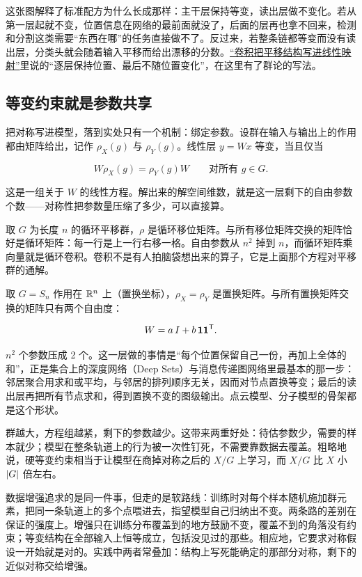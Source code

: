 这张图解释了标准配方为什么长成那样：主干层保持等变，读出层做不变化。若从第一层起就不变，位置信息在网络的最前面就没了，后面的层再也拿不回来，检测和分割这类需要``东西在哪''的任务直接做不了。反过来，若整条链都等变而没有读出层，分类头就会随着输入平移而给出漂移的分数。\hyperref[sec:14-Deep-Learning/04-Convolutional-Networks/01]{``卷积把平移结构写进线性映射''}里说的``逐层保持位置、最后不随位置变化''，在这里有了群论的写法。

\subsection{等变约束就是参数共享}

把对称写进模型，落到实处只有一个机制：绑定参数。设群在输入与输出上的作用都由矩阵给出，记作 \(\rho_X(g)\) 与 \(\rho_Y(g)\)。线性层 \(y=Wx\) 等变，当且仅当

\[
W\rho_X(g)=\rho_Y(g)W\qquad\text{对所有 }g\in G.
\]

这是一组关于 \(W\) 的线性方程。解出来的解空间维数，就是这一层剩下的自由参数个数——对称性把参数量压缩了多少，可以直接算。

取 \(G\) 为长度 \(n\) 的循环平移群，\(\rho\) 是循环移位矩阵。与所有移位矩阵交换的矩阵恰好是循环矩阵：每一行是上一行右移一格。自由参数从 \(n^2\) 掉到 \(n\)，而循环矩阵乘向量就是循环卷积。卷积不是有人拍脑袋想出来的算子，它是上面那个方程对平移群的通解。

取 \(G=S_n\) 作用在 \(\mathbb{R}^n\) 上（置换坐标），\(\rho_X=\rho_Y\) 是置换矩阵。与所有置换矩阵交换的矩阵只有两个自由度：

\[
W=a\,I+b\,\mathbf{1}\mathbf{1}^{\mathsf{T}}.
\]

\(n^2\) 个参数压成 2 个。这一层做的事情是``每个位置保留自己一份，再加上全体的和''，正是集合上的深度网络（Deep Sets）与消息传递图网络里最基本的那一步：邻居聚合用求和或平均，与邻居的排列顺序无关，因而对节点置换等变；最后的读出层再把所有节点求和，得到置换不变的图级输出。点云模型、分子模型的骨架都是这个形状。

群越大，方程组越紧，剩下的参数越少。这带来两重好处：待估参数少，需要的样本就少；模型在整条轨道上的行为被一次性钉死，不需要靠数据去覆盖。粗略地说，硬等变约束相当于让模型在商掉对称之后的 \(X/G\) 上学习，而 \(X/G\) 比 \(X\) 小 \(\left|G\right|\) 倍左右。

数据增强追求的是同一件事，但走的是软路线：训练时对每个样本随机施加群元素，把同一条轨道上的多个点喂进去，指望模型自己归纳出不变。两条路的差别在保证的强度上。增强只在训练分布覆盖到的地方鼓励不变，覆盖不到的角落没有约束；等变结构在全部输入上恒等成立，包括没见过的那些。相应地，它要求对称假设一开始就是对的。实践中两者常叠加：结构上写死能确定的那部分对称，剩下的近似对称交给增强。

